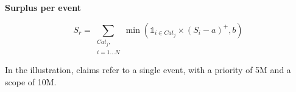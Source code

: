 \begin{f}
\textbf{Surplus per event}
	
	$$
	S_r= \sum_{\begin{array}{c}
			Cat_j,\\ i=1\ldots N
	\end{array}} \min\left( \mathds{1}_{i\in Cat_j}\times \left( S_i-a\right)^+,b\right)  
	$$
	
	In the illustration, claims refer to a single event, with a priority of 5M\EUR{} and a scope of 10M\EUR{}.
	


\end{f}
